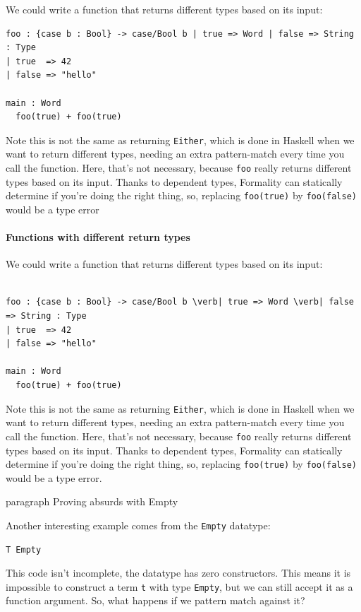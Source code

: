 \documentclass{article}
\theoremstyle{definition}
\theoremstyle{theorem}
\begin{document}
We could write a function that returns different types based on its input:

\begin{lstlisting}
foo : {case b : Bool} -> case/Bool b | true => Word | false => String : Type
| true  => 42
| false => "hello"

main : Word
  foo(true) + foo(true)
\end{lstlisting}

Note this is not the same as returning \verb|Either|, which is done in Haskell
when we want to return different types, needing an extra pattern-match every
time you call the function. Here, that's not necessary, because \verb|foo|
really returns different types based on its input. Thanks to dependent types,
Formality can statically determine if you're doing the right thing, so,
replacing \verb|foo(true)| by \verb|foo(false)| would be a type error

\paragraph{Functions with different return types}

We could write a function that returns different types based on its input:

\begin{lstlisting}

foo : {case b : Bool} -> case/Bool b \verb| true => Word \verb| false => String : Type
| true  => 42
| false => "hello"

main : Word
  foo(true) + foo(true)
\end{lstlisting}

Note this is not the same as returning \verb|Either|, which is done in Haskell when we want to return different types, needing an extra pattern-match every time you call the function. Here, that's not necessary, because \verb|foo| really returns different types based on its input. Thanks to dependent types, Formality can statically determine if you're doing the right thing, so, replacing \verb|foo(true)| by \verb|foo(false)| would be a type error.

paragraph{ Proving absurds with Empty}

Another interesting example comes from the \verb|Empty| datatype:

\begin{lstlisting}
T Empty
\end{lstlisting}

This code isn't incomplete, the datatype has zero constructors. This means it is
impossible to construct a term \verb|t| with type \verb|Empty|, but we can still
accept it as a function argument. So, what happens if we pattern match against
it?
\end{document}
